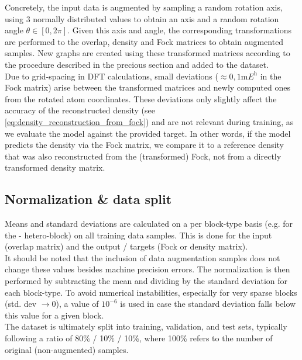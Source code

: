Concretely, the input data is augmented by sampling a random rotation axis, using 3 normally distributed values to obtain an axis and a random rotation angle $\theta \in [0, 2\pi]$. Given this axis and angle, the corresponding transformations are performed to the overlap, density and Fock matrices to obtain augmented samples. New graphs are created using these transformed matrices according to the procedure described in the precious section and added to the dataset. \\
Due to grid-spacing in DFT calculations, small deviations ($\approx 0,1 \unit{\milli\hartree}$ in the Fock matrix) arise between the transformed matrices and newly computed ones from the rotated atom coordinates. These deviations only slightly affect the accuracy of the reconstructed density (see \autoref{eq:density_reconstruction_from_fock}) and are not relevant during training, as we evaluate the model against the provided target. In other words, if the model predicts the density via the Fock matrix, we compare it to a reference density that was also reconstructed from the (transformed) Fock, not from a directly transformed density matrix.\\

\subsection{Normalization \& data split}
\label{subsec:gnn_normalization}
Means and standard deviations are calculated on a per block-type basis (e.g. for the - hetero-block) on all training data samples. This is done for the input (overlap matrix) and the output / targets (Fock or density matrix).\\
It should be noted that the inclusion of data augmentation samples does not change these values besides machine precision errors. The normalization is then performed by subtracting the mean and dividing by the standard deviation for each block-type. To avoid numerical instabilities, especially for very sparse blocks (std. dev $\rightarrow 0$), a value of $10^{-6}$ is used in case the standard deviation falls below this value for a given block. \\

The dataset is ultimately split into training, validation, and test sets, typically following a ratio of 80\% / 10\% / 10\%, where 100\% refers to the number of original (non-augmented) samples.

